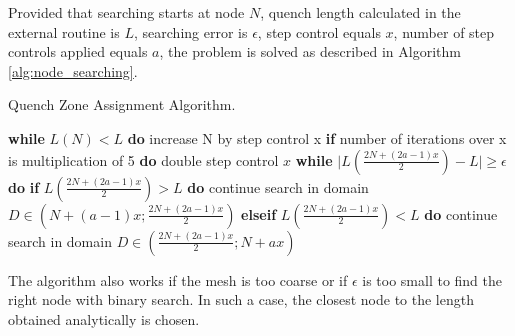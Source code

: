 Provided that searching starts at node $N$, quench length calculated in the external routine is $L$, searching error is $\epsilon$, step control equals $x$, number of step controls applied equals $a$, the problem is solved as described in Algorithm \ref{alg:node_searching}.

\begin{algorithm}[H]
    \caption{Quench Zone Assignment Algorithm.}
    \label{alg:node_searching}
    \begin{algorithmic}[1]
    \STATE \textbf{while} $L(N) < L$ \textbf{do}
    \STATE \hspace{0.5cm} increase N by step control x
    \STATE \hspace{0.5cm} \textbf{if} number of iterations over x is multiplication of 5 \textbf{do}
    \STATE \hspace{1.0cm} double step control $x$
    \STATE \textbf{while} $\mid L(\frac{2N+(2a-1)x}{2}) - L \mid \geq \epsilon$ \textbf{do}
    \STATE \hspace{0.5cm} \textbf{if} $L(\frac{2N+(2a-1)x}{2}) > L$ \textbf{do}
    \STATE \hspace{1.0cm} continue search in domain $D \in (N+(a-1)x ; \frac{2N+(2a-1)x}{2})$
    \STATE \hspace{0.5cm} \textbf{elseif} $L(\frac{2N+(2a-1)x}{2}) < L$ \textbf{do}
    \STATE \hspace{1.0cm} continue search in domain $D \in (\frac{2N+(2a-1)x}{2} ; N+ax)$
    \end{algorithmic}
\end{algorithm}

The algorithm also works if the mesh is too coarse or if $\epsilon$ is too small to find the right node with binary search. In such a case, the closest node to the length obtained analytically is chosen.